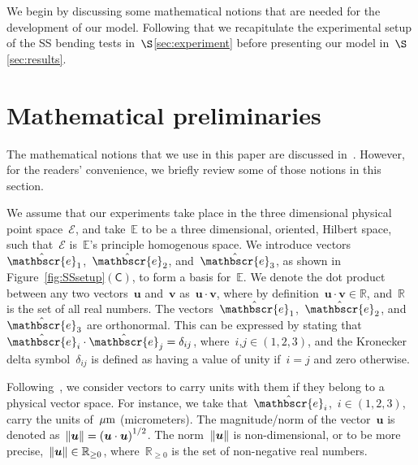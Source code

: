 \documentclass[preprint,10pt,times]{elsarticle}
\numberwithin{equation}{section}
\newcommand{\physe}{\hat{\mathbscr{e}}} %
\renewcommand{\u}[1]{\boldsymbol{#1}}
\newcommand{\pr}[1]{\left( #1 \right)}
\newcommand{\norm}[1]{\ensuremath \lVert #1 \rVert}
\newcommand{\subf}[1]{\pr{\textsf{#1}}}
\begin{document}
We begin by discussing some mathematical notions that are needed for
the development of our model. Following that we recapitulate the experimental
setup of the SS bending tests in~$\S$\ref{sec:experiment} before
presenting our model in~$\S$\ref{sec:results}.

\section{Mathematical preliminaries\label{sec:notion}}

The mathematical notions that we use in this paper are discussed in~\cite[Section 2.1,][]{Sayaka2021Sawtooth}.
However, for the readers' convenience, we briefly review some of those
notions in this section.

We assume that our experiments take place in the three dimensional
physical point space~$\mathcal{E}$, and take~$\mathbb{E}$ to be
a three dimensional, oriented, Hilbert space, such that~$\mathcal{E}$
is~$\mathbb{E}$'s principle homogenous space. We introduce vectors~$\physe_1$,~$\physe_2$,
and~$\physe_3$, as shown in Figure~\ref{fig:SSsetup}$\subf{C}$,
to form a basis for~$\mathbb{E}$. We denote the dot product between
any two vectors~$\u{u}$ and~$\u{v}$ as~$\u{u}\cdot\u{v}$, where
by definition~$\u{u}\cdot\u{v}\in\mathbb{R}$, and~$\mathbb{R}$
is the set of all real numbers. The vectors~$\physe_1$,~$\physe_2$,
and~$\physe_3$ are orthonormal. This can be expressed by stating
that~$\physe_i\cdot\physe_j=\delta_{ij}$, where~$i$,$j\in (1,2,3)$,
and the Kronecker delta symbol~$\delta_{ij}$ is defined as having
a value of unity if~$i=j$ and zero otherwise.

Following~\cite{masiur2019accelerometer}, we consider vectors to
carry units with them if they belong to a physical vector space. For
instance, we take that~$\physe_i$,~$i\in(1,2,3)$, carry the units
of~$\rm\mu m$ (micrometers). The magnitude/norm of the vector~$\u{u}$
is denoted as~$\norm{\u{u}}=\pr{\u{u}\cdot\u{u}}^{1/2}$. The norm~$\norm{\u{u}}$
is non-dimensional, or to be more precise,~$\norm{\u{u}}\in\mathbb{R}_{\ge 0}$,
where~$\mathbb{R}_{\ge 0}$ is the set of non-negative real numbers.
\end{document}
